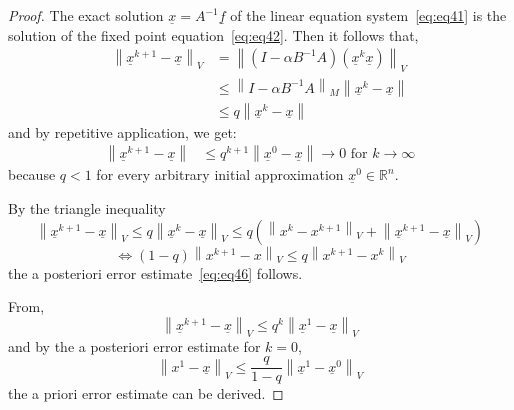 \documentclass{article}
\newcommand{\norm}[1]{\left\|#1\right\|}
\begin{document}
\begin{proof}
  The exact solution $\underline{x} = A^{-1} \underline{f}$ of the linear equation system~\ref{eq:eq41}
  is the solution of the fixed point equation~\ref{eq:eq42}. Then it follows that,
  \begin{align*}
    \norm{\underline{x}^{k+1} - \underline{x}}_V &= \norm{(I - \alpha B^{-1} A)(\underline{x}^k \underline{x})}_V \\
      &\leq \norm{I - \alpha B^{-1} A}_M \norm{\underline{x}^k - \underline{x}} \\
      &\leq q \norm{\underline{x}^k - \underline{x}}
  \end{align*}
  and by repetitive application, we get:
  \begin{align*} \norm{\underline{x}^{k+1} - \underline{x}} &\leq q^{k+1} \norm{\underline{x}^0 - \underline{x}} \to 0 \text{ for } k \to \infty \end{align*}
  because $q < 1$ for every arbitrary initial approximation $\underline{x}^0 \in \mathbb R^n$.

  By the triangle inequality
  \[
    \norm{\underline{x}^{k+1} - \underline{x}}_V
    \leq q \norm{\underline{x}^k - \underline{x}}_V
    \leq q \left(\norm{x^k - x^{k+1}}_V + \norm{\underline{x}^{k+1} - \underline{x}}_V\right)
  \] \[
    \iff (1 - q) \norm{x^{k+1} - x}_V \leq q \norm{x^{k+1} - x^k}_V
  \]
  the a posteriori error estimate~\ref{eq:eq46} follows.

  From,
  \[ \norm{\underline{x}^{k+1} - \underline{x}}_V \leq q^k \norm{\underline{x}^1 - \underline{x}}_V \]
  and by the a posteriori error estimate for $k=0$,
  \[ \norm{x^1 - \underline{x}}_V \leq \frac{q}{1 - q} \norm{\underline{x}^1 - \underline{x}^0}_V \]
  the a priori error estimate can be derived.
\end{proof}
\end{document}
